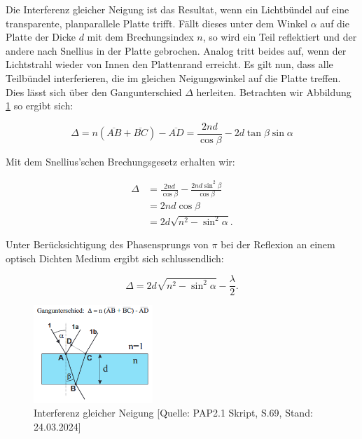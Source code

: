 \documentclass{article}
\begin{document}
Die Interferenz gleicher Neigung ist das Resultat, wenn ein Lichtbündel auf eine transparente, planparallele Platte trifft. Fällt dieses unter dem Winkel $\alpha$ auf die Platte der Dicke $d$ mit dem Brechungsindex $n$, so wird ein Teil reflektiert und der andere nach Snellius in der Platte gebrochen. Analog tritt beides auf, wenn der Lichtstrahl wieder von Innen den Plattenrand erreicht. Es gilt nun, dass alle Teilbündel interferieren, die im gleichen Neigungswinkel auf die Platte treffen. Dies lässt sich über den Gangunterschied $\Delta$ herleiten. Betrachten wir Abbildung \ref{fig:gleicheNeigung} so ergibt sich:

\begin{equation}
    \Delta = n ( \overline{AB} + \overline{BC} ) - \overline{AD} = \frac{2nd}{\cos{\beta}} - 2d \tan{\beta} \sin{\alpha}
\end{equation}

Mit dem Snellius'schen Brechungsgesetz erhalten wir:

\begin{equation}
    \begin{split}
        \Delta &= \frac{2nd}{\cos{\beta}} - \frac{2nd \sin^2{\beta}}{\cos{\beta}} \\
        &= 2nd \cos{\beta} \\
        &= 2d \sqrt{n^2 - \sin^2{\alpha}}.
    \end{split}
\end{equation}

Unter Berücksichtigung des Phasensprungs von $\pi$ bei der Reflexion an einem optisch Dichten Medium ergibt sich schlussendlich:

\begin{equation}
    \Delta = 2d \sqrt{n^2 - \sin^2{\alpha}} - \frac{\lambda}{2}.
\end{equation}

\begin{figure}[!b]
    \centering
    \includegraphics[width=0.4\textwidth]{graphics/skript/gleiche neigung.png}
    \caption{Interferenz gleicher Neigung [Quelle: PAP2.1 Skript, S.69, Stand: 24.03.2024]}
    \label{fig:gleicheNeigung}
\end{figure}
\end{document}
